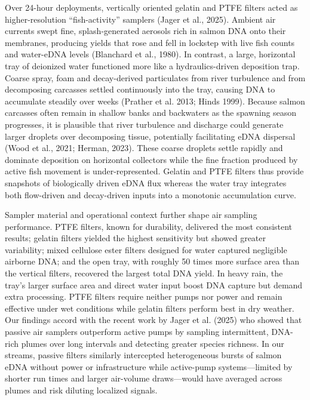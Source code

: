 \documentclass{article}
\begin{document}
Over 24-hour deployments, vertically oriented gelatin and PTFE filters acted as higher-resolution “fish-activity” samplers (Jager et al., 2025). Ambient air currents swept fine, splash-generated aerosols rich in salmon DNA onto their membranes, producing yields that rose and fell in lockstep with live fish counts and water-eDNA levels (Blanchard et al., 1980). In contrast, a large, horizontal tray of deionized water functioned more like a hydraulics-driven deposition trap. Coarse spray, foam and decay-derived particulates from river turbulence and from decomposing carcasses settled continuously into the tray, causing DNA to accumulate steadily over weeks (Prather et al. 2013; Hinds 1999). Because salmon carcasses often remain in shallow banks and backwaters as the spawning season progresses, it is plausible that river turbulence and discharge could generate larger droplets over decomposing tissue, potentially facilitating eDNA dispersal (Wood et al., 2021; Herman, 2023). These coarse droplets settle rapidly and dominate deposition on horizontal collectors while the fine fraction produced by active fish movement is under-represented. Gelatin and PTFE filters thus provide snapshots of biologically driven eDNA flux whereas the water tray integrates both flow-driven and decay-driven inputs into a monotonic accumulation curve.

Sampler material and operational context further shape air sampling performance. PTFE filters, known for durability, delivered the most consistent results; gelatin filters yielded the highest sensitivity but showed greater variability; mixed cellulose ester filters designed for water captured negligible airborne DNA; and the open tray, with roughly 50 times more surface area than the vertical filters, recovered the largest total DNA yield. In heavy rain, the tray’s larger surface area and direct water input boost DNA capture but demand extra processing. PTFE filters require neither pumps nor power and remain effective under wet conditions while gelatin filters perform best in dry weather. Our findings accord with the recent work by Jager et al. (2025) who showed that passive air samplers outperform active pumps by sampling intermittent, DNA-rich plumes over long intervals and detecting greater species richness. In our streams, passive filters similarly intercepted heterogeneous bursts of salmon eDNA without power or infrastructure while active-pump systems—limited by shorter run times and larger air-volume draws—would have averaged across plumes and risk diluting localized signals.
\end{document}
